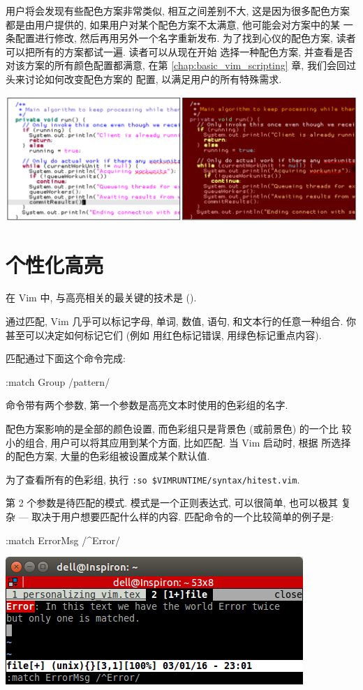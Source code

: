 用户将会发现有些配色方案非常类似, 相互之间差别不大, 这是因为很多配色方案
都是由用户提供的, 如果用户对某个配色方案不太满意, 他可能会对方案中的某
一条配置进行修改, 然后再用另外一个名字重新发布.
为了找到心仪的配色方案, 读者可以把所有的方案都试一遍. 读者可以从现在开始
选择一种配色方案, 并查看是否对该方案的所有颜色配置都满意, 在第
\ref{chap:basic_vim_scripting} 章, 我们会回过头来讨论如何改变配色方案的
配置, 以满足用户的所有特殊需求.
\begin{center}
\includegraphics[scale=0.4]{./images/page22.png}
\end{center}

\section{个性化高亮}
\label{sec:personal_highlighting}
在 Vim 中, 与高亮相关的最关键的技术是  ().

通过匹配, Vim 几乎可以标记字母, 单词, 数值, 语句, 和文本行的任意一种组合.
你甚至可以决定如何标记它们 (例如 用红色标记错误, 用绿色标记重点内容).

匹配通过下面这个命令完成:
\begin{vimcmd}
:match Group /pattern/
\end{vimcmd}
命令带有两个参数, 第一个参数是高亮文本时使用的色彩组的名字.
\begin{warning}
    配色方案影响的是全部的颜色设置, 而色彩组只是背景色 (或前景色) 的一个比
    较小的组合, 用户可以将其应用到某个方面, 比如匹配. 当 Vim 启动时, 根据
    所选择的配色方案, 大量的色彩组被设置成某个默认值.

    为了查看所有的色彩组, 执行 \texttt{:so \$VIMRUNTIME/syntax/hitest.vim}.
\end{warning}
第 2 个参数是待匹配的模式. 模式是一个正则表达式, 可以很简单, 也可以极其
复杂 --- 取决于用户想要匹配什么样的内容. 匹配命令的一个比较简单的例子是:
\begin{vimcmd}
:match ErrorMsg /^Error/
\end{vimcmd}
\begin{center}
\includegraphics[scale=0.7]{./images/page23.png}
\end{center}

